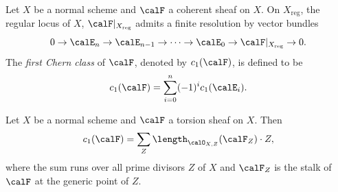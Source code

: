     \begin{definition}\label{def:first_chern_class_coherent_sheaves}
        Let \(X\) be a normal scheme and \(\calF\) a coherent sheaf on \(X\).
        On \(X_{\text{reg}}\), the regular locus of \(X\), \(\calF|_{X_{\text{reg}}}\) admits a finite resolution by vector bundles
        \[ 0 \to \calE_n \to \calE_{n-1} \to \cdots \to \calE_0 \to \calF|_{X_{\text{reg}}} \to 0. \]
        The \emph{first Chern class} of \(\calF\), denoted by \(c_1(\calF)\), is defined to be
        \[ c_1(\calF) = \sum_{i=0}^n (-1)^i c_1(\calE_i). \]
    \end{definition}

    \begin{proposition}\label{prop:first_chern_class_of_torsion_sheaves}
        Let \(X\) be a normal scheme and \(\calF\) a torsion sheaf on \(X\).
        Then 
        \[ c_1(\calF) = \sum_{Z} \length_{\calO_{X,Z}}(\calF_Z) \cdot Z, \]
        where the sum runs over all prime divisors \(Z\) of \(X\) and \(\calF_Z\) is the stalk of \(\calF\) at the generic point of \(Z\).
    \end{proposition}
